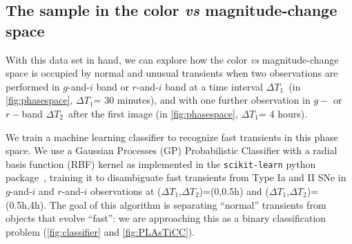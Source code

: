 \documentclass[letterpaper,longauthor,trackchanges,twocolumn,onecolappendix,sort&compress]{aastex62}
\newcommand{\dtone}{\ensuremath{\Delta T_1}}
\newcommand{\dttwo}{\ensuremath{\Delta T_2}}
\newcommand\rahul[1]{\textcolor{blue}{#1}}
\begin{document}





\subsection{The sample in the color \emph{vs} magnitude-change space}\label{sec:classification}

With this data set in hand, we can explore how the color \emph{vs} magnitude-change space is occupied by normal and unusual transients when two observations are performed in $g$-and-$i$ band or $r$-and-$i$ band at a time interval \dtone\ (in \autoref{fig:phasespace}, \dtone = 30 minutes), and with one further observation in $g-$ or $r-$band \dttwo\ after the first image (in \autoref{fig:phasespace}, \dtone = 4 hours). 

We train a machine learning classifier to recognize fast transients in this phase space. We use a Gaussian Processes (GP) Probabilistic Classifier \citep{Rasmussen06gaussianprocesses} with a radial basis function (RBF) kernel as implemented in the {\tt scikit-learn} python package~\citep{scikit-learn}, training it to disambiguate fast transients from Type Ia and II SNe in $g$-and-$i$ and $r$-and-$i$ observations at (\dtone,\dttwo)=(0,0.5h) and (\dtone,\dttwo)=(0.5h,4h). The goal of this algorithm is  separating ``normal'' transients from objects that evolve ``fast'': we are approaching this as a binary classification problem (\autoref{fig:classifier} and \autoref{fig:PLAsTiCC}).
\end{document}
